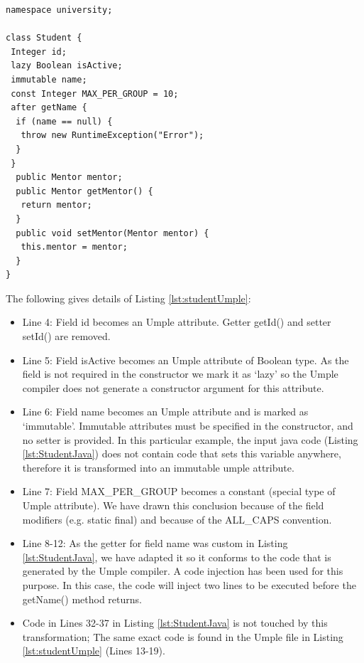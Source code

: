 \begin{lstlisting}[style=UmpleOut,caption=Student.ump,label=lst:studentUmple]
namespace university;

class Student { 
 Integer id; 
 lazy Boolean isActive; 
 immutable name; 
 const Integer MAX_PER_GROUP = 10; 
 after getName {
  if (name == null) { 
   throw new RuntimeException("Error");
  }
 }
  public Mentor mentor; 
  public Mentor getMentor() { 
   return mentor; 
  }
  public void setMentor(Mentor mentor) { 
   this.mentor = mentor; 
  } 
}
\end{lstlisting}


The following gives details of Listing \ref{lst:studentUmple}:
\begin{itemize}
\item Line 4: Field id becomes an Umple attribute. Getter getId() and setter setId() are removed.


\item Line 5: Field isActive becomes an Umple attribute of Boolean type.  As the field is not required in the constructor we mark it as `lazy' so the Umple compiler does not generate a constructor argument for this attribute. 

\item Line 6: Field name becomes an Umple attribute and is marked as `immutable'. Immutable attributes must be specified in the constructor, and no setter is provided. In this particular example, the input java code (Listing \ref{lst:StudentJava}) does not contain code that sets this variable anywhere, therefore it is transformed into an immutable umple attribute. 

\item Line 7: Field MAX\_PER\_GROUP becomes a constant (special type of Umple attribute). We have drawn this conclusion because of the field modifiers (e.g. static final) and because of the ALL\_CAPS convention. 

\item Line 8-12: As the getter for field name was custom in Listing \ref{lst:StudentJava}, we have adapted it so it conforms to the code that is generated by the Umple compiler. A code injection has been used for this purpose. In this case, the code will inject two lines to be executed before the getName() method returns.

\item Code in Lines 32-37 in Listing \ref{lst:StudentJava} is not touched by this transformation; The same exact code is found in the Umple file in Listing \ref{lst:studentUmple} (Lines 13-19).

\end{itemize}

